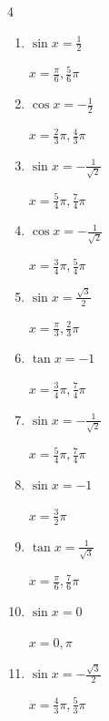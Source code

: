 \begin{multicols}{4}
\begin{enumerate}
        $\displaystyle x = \frac{3}{4}\pi , \frac{7}{4}\pi$

  \item $\displaystyle \sin{x}  = \frac{1}{2}$

        $\displaystyle x = \frac{\pi}{6} , \frac{5}{6}\pi$

  \item $\displaystyle \cos{x}  = -\frac{1}{2}$

        $\displaystyle x = \frac{2}{3}\pi , \frac{4}{3}\pi$

  \item $\displaystyle \sin{x}  = -\frac{1}{\sqrt{2}}$

        $\displaystyle x = \frac{5}{4}\pi , \frac{7}{4}\pi$

  \item $\displaystyle \cos{x}  = -\frac{1}{\sqrt{2}}$

        $\displaystyle x = \frac{3}{4}\pi , \frac{5}{4}\pi$

  \item $\displaystyle \sin{x}  = \frac{\sqrt{3}}{2}$

        $\displaystyle x = \frac{\pi}{3} , \frac{2}{3}\pi$

  \item $\displaystyle \tan{x}  = -1$

        $\displaystyle x = \frac{3}{4}\pi , \frac{7}{4}\pi$

  \item $\displaystyle \sin{x}  = -\frac{1}{\sqrt{2}}$

        $\displaystyle x = \frac{5}{4}\pi , \frac{7}{4}\pi$

  \item $\displaystyle \sin{x}  = -1$

        $\displaystyle x = \frac{3}{2}\pi$

  \item $\displaystyle \tan{x}  = \frac{1}{\sqrt{3}}$

        $\displaystyle x = \frac{\pi}{6} , \frac{7}{6}\pi$

  \item $\displaystyle \sin{x}  = 0$

        $\displaystyle x = 0 , \pi$

  \item $\displaystyle \sin{x}  = -\frac{\sqrt{3}}{2}$

        $\displaystyle x = \frac{4}{3}\pi , \frac{5}{3}\pi$

\columnbreak %


\end{enumerate}
\end{multicols}
